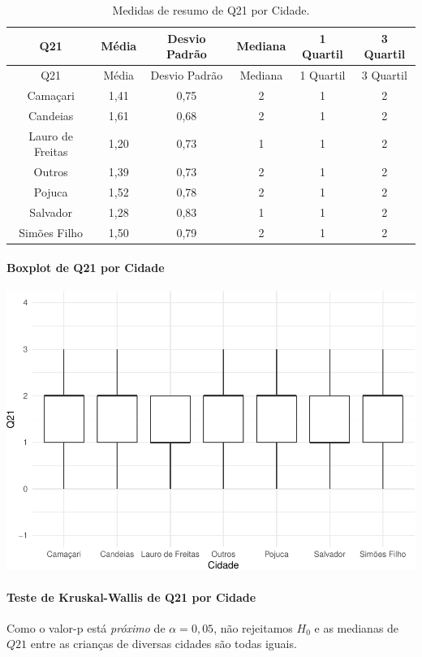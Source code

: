 \documentclass[]{article}
\let\oldparagraph\paragraph
\renewcommand{\paragraph}[1]{\oldparagraph{#1}\mbox{}}
\begin{document}
\begin{longtable}[]{@{}cccccc@{}}
\caption{\label{tab:unnamed-chunk-329}Medidas de resumo de Q21 por Cidade.}\tabularnewline
\toprule
Q21 & Média & Desvio Padrão & Mediana & 1 Quartil & 3 Quartil\tabularnewline
\midrule
\endfirsthead
\toprule
Q21 & Média & Desvio Padrão & Mediana & 1 Quartil & 3 Quartil\tabularnewline
\midrule
\endhead
Camaçari & 1,41 & 0,75 & 2 & 1 & 2\tabularnewline
Candeias & 1,61 & 0,68 & 2 & 1 & 2\tabularnewline
Lauro de Freitas & 1,20 & 0,73 & 1 & 1 & 2\tabularnewline
Outros & 1,39 & 0,73 & 2 & 1 & 2\tabularnewline
Pojuca & 1,52 & 0,78 & 2 & 1 & 2\tabularnewline
Salvador & 1,28 & 0,83 & 1 & 1 & 2\tabularnewline
Simões Filho & 1,50 & 0,79 & 2 & 1 & 2\tabularnewline
\bottomrule
\end{longtable}

\hypertarget{boxplot-de-q21-por-cidade}{%
\paragraph{Boxplot de Q21 por Cidade}\label{boxplot-de-q21-por-cidade}}

\begin{center}\includegraphics[width=0.75\linewidth]{relatorio_files/figure-latex/unnamed-chunk-330-1} \end{center}

\hypertarget{teste-de-kruskal-wallis-de-q21-por-cidade}{%
\paragraph{Teste de Kruskal-Wallis de Q21 por Cidade}\label{teste-de-kruskal-wallis-de-q21-por-cidade}}

Como o valor-p está \emph{próximo} de \(\alpha=0,05\), não rejeitamos \(H_0\) e as medianas de \(Q21\) entre as crianças de diversas cidades são todas iguais.
\end{document}
